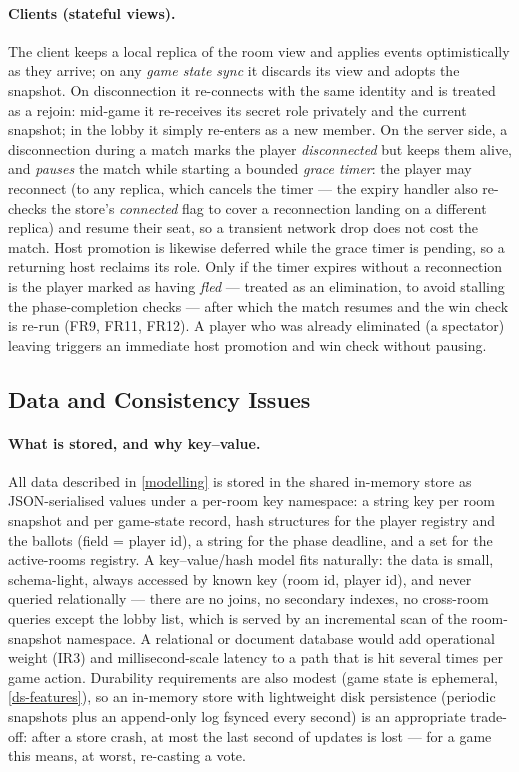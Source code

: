 \documentclass{scrartcl}
\begin{document}
\paragraph{Clients (stateful views).}
The client keeps a local replica of the room view and applies events
optimistically as they arrive; on any \emph{game state sync} it discards
its view and adopts the snapshot. On disconnection it re-connects with the
same identity and is treated as a rejoin: mid-game it re-receives its
secret role privately and the current snapshot; in the lobby it simply
re-enters as a new member. On the server side, a disconnection during a
match marks the player \emph{disconnected} but keeps them alive, and
\emph{pauses} the match while starting a bounded \emph{grace timer}: the
player may reconnect (to any replica, which cancels the timer --- the
expiry handler also re-checks the store's \emph{connected} flag to cover a
reconnection landing on a different replica) and resume their seat, so a
transient network drop does not cost the match. Host promotion is likewise
deferred while the grace timer is pending, so a returning host reclaims its
role. Only if the timer expires without a reconnection is the player marked
as having \emph{fled} --- treated as an elimination, to avoid stalling the
phase-completion checks --- after which the match resumes and the win check
is re-run (FR9, FR11, FR12). A player who was already eliminated (a
spectator) leaving triggers an immediate host promotion and win check
without pausing.

\subsection{Data and Consistency Issues}\label{data-and-consistency-issues}

\paragraph{What is stored, and why key--value.}
All data described in \cref{modelling} is stored in the shared in-memory
store as JSON-serialised values under a per-room key namespace: a string
key per room snapshot and per game-state record, hash structures for the
player registry and the ballots (field = player id), a string for the
phase deadline, and a set for the active-rooms registry. A key--value/hash
model fits naturally: the data is small, schema-light, always accessed by
known key (room id, player id), and never queried relationally --- there are
no joins, no secondary indexes, no cross-room queries except the lobby
list, which is served by an incremental scan of the room-snapshot
namespace. A relational or document database would add operational weight
(IR3) and millisecond-scale latency to a path that is hit several times
per game action. Durability requirements are also modest (game state is
ephemeral, \cref{ds-features}), so an in-memory store with lightweight
disk persistence (periodic snapshots plus an append-only log fsynced every
second) is an appropriate trade-off: after a store crash, at most the last
second of updates is lost --- for a game this means, at worst, re-casting a
vote.
\end{document}
